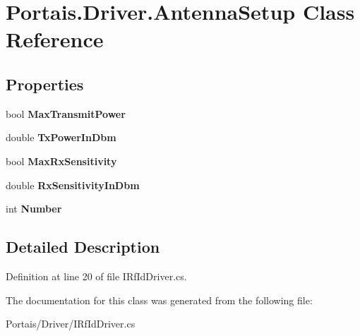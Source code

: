 \hypertarget{class_portais_1_1_driver_1_1_antenna_setup}{}\section{Portais.\+Driver.\+Antenna\+Setup Class Reference}
\label{class_portais_1_1_driver_1_1_antenna_setup}
\subsection*{Properties}
\begin{DoxyCompactItemize}
\item 
bool {\bfseries Max\+Transmit\+Power}\hypertarget{class_portais_1_1_driver_1_1_antenna_setup_a736a04f9e6e255733f027898b75619f5}{}\label{class_portais_1_1_driver_1_1_antenna_setup_a736a04f9e6e255733f027898b75619f5}

\item 
double {\bfseries Tx\+Power\+In\+Dbm}\hypertarget{class_portais_1_1_driver_1_1_antenna_setup_acc1e3ff14981e0645617e5d3e5394a87}{}\label{class_portais_1_1_driver_1_1_antenna_setup_acc1e3ff14981e0645617e5d3e5394a87}

\item 
bool {\bfseries Max\+Rx\+Sensitivity}\hypertarget{class_portais_1_1_driver_1_1_antenna_setup_a64c2f5a3d18dab566edc19a7ff6cd066}{}\label{class_portais_1_1_driver_1_1_antenna_setup_a64c2f5a3d18dab566edc19a7ff6cd066}

\item 
double {\bfseries Rx\+Sensitivity\+In\+Dbm}\hypertarget{class_portais_1_1_driver_1_1_antenna_setup_ac12dc46d71a9c06cb822e3f62adfdf9a}{}\label{class_portais_1_1_driver_1_1_antenna_setup_ac12dc46d71a9c06cb822e3f62adfdf9a}

\item 
int {\bfseries Number}\hypertarget{class_portais_1_1_driver_1_1_antenna_setup_a8529e6dcef4e1a50c2adec54f2e3992c}{}\label{class_portais_1_1_driver_1_1_antenna_setup_a8529e6dcef4e1a50c2adec54f2e3992c}

\end{DoxyCompactItemize}


\subsection{Detailed Description}


Definition at line 20 of file I\+Rf\+Id\+Driver.\+cs.



The documentation for this class was generated from the following file\+:\begin{DoxyCompactItemize}
\item 
Portais/\+Driver/I\+Rf\+Id\+Driver.\+cs\end{DoxyCompactItemize}
